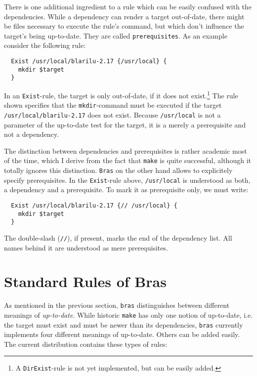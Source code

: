 \documentclass[12pt]{article}
\newcommand{\bras}{\texttt{bras}}
\newcommand{\Bras}{\texttt{Bras}}
\newcommand{\make}{\texttt{make}}
\begin{document}
There is one additional ingredient to a rule which can be easily
confused with the dependencies. While a dependency can render a target
out-of-date, there might be files necessary to execute the rule's
command, but which don't influence the target's being up-to-date.
They are called \texttt{prerequisites}. As an example consider the
following rule:

\begin{verbatim}
  Exist /usr/local/blarilu-2.17 {/usr/local} {
    mkdir $target
  }
\end{verbatim}

In an \texttt{Exist}-rule, the target is only out-of-date, if it does
not exist.\footnote{A \texttt{DirExist}-rule is not yet implemented,
but can be easily added.} The rule shown specifies that the
\texttt{mkdir}-command must be executed if the target
\texttt{/usr/local/blarilu-2.17} does not exist.
Because \texttt{/usr/local} is not a
parameter of the up-to-date test for the target, it is a merely a
prerequisite and not a dependency.

The distinction between dependencies and prerequisites is rather
academic most of the time, which I derive from the fact that \make{}
is quite successful, although it totally ignores this
distinction. \Bras{} on the other hand allows to explicitely specify
prerequisites. In the \texttt{Exist}-rule above, \texttt{/usr/local}
is understood as both, a dependency and a prerequisite. To mark it as
prerequisite only, we must write:

\begin{verbatim}
  Exist /usr/local/blarilu-2.17 {// /usr/local} {
    mkdir $target
  }
\end{verbatim}

The double-slash (\texttt{//}), if present, marks the end of the
dependency list. All names behind it are understood as mere
prerequisites. 

\section{Standard Rules of Bras}
\label{SecStandardRules}
As mentioned in the previous section, \bras{} distinguishes between
different meanings of \textit{up-to-date}. While historic
\make{} has only one notion of up-to-date, i.e. the target must exist
and must be newer than its dependencies, \bras{} currently implements
four different meanings of up-to-date. Others can be added
easily. The current distribution contains these types of rules:
\end{document}
